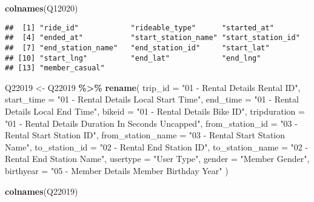 \documentclass[
]{article}
\newenvironment{Shaded}{\begin{snugshade}}{\end{snugshade}}
\newcommand{\AttributeTok}[1]{\textcolor[rgb]{0.13,0.29,0.53}{#1}}
\newcommand{\FunctionTok}[1]{\textcolor[rgb]{0.13,0.29,0.53}{\textbf{#1}}}
\newcommand{\NormalTok}[1]{#1}
\newcommand{\OtherTok}[1]{\textcolor[rgb]{0.56,0.35,0.01}{#1}}
\newcommand{\SpecialCharTok}[1]{\textcolor[rgb]{0.81,0.36,0.00}{\textbf{#1}}}
\newcommand{\StringTok}[1]{\textcolor[rgb]{0.31,0.60,0.02}{#1}}
\begin{document}
\begin{Shaded}
\begin{Highlighting}[]
\FunctionTok{colnames}\NormalTok{(Q12020)}
\end{Highlighting}
\end{Shaded}

\begin{verbatim}
##  [1] "ride_id"            "rideable_type"      "started_at"        
##  [4] "ended_at"           "start_station_name" "start_station_id"  
##  [7] "end_station_name"   "end_station_id"     "start_lat"         
## [10] "start_lng"          "end_lat"            "end_lng"           
## [13] "member_casual"
\end{verbatim}

\begin{Shaded}
\begin{Highlighting}[]
\NormalTok{Q22019 }\OtherTok{\textless{}{-}}\NormalTok{ Q22019 }\SpecialCharTok{\%\textgreater{}\%} 
  \FunctionTok{rename}\NormalTok{(}
    \AttributeTok{trip\_id =} \StringTok{"01 {-} Rental Details Rental ID"}\NormalTok{,}
    \AttributeTok{start\_time =} \StringTok{"01 {-} Rental Details Local Start Time"}\NormalTok{,}
    \AttributeTok{end\_time =} \StringTok{"01 {-} Rental Details Local End Time"}\NormalTok{,}
    \AttributeTok{bikeid =} \StringTok{"01 {-} Rental Details Bike ID"}\NormalTok{,}
    \AttributeTok{tripduration =} \StringTok{"01 {-} Rental Details Duration In Seconds Uncapped"}\NormalTok{,}
    \AttributeTok{from\_station\_id =} \StringTok{"03 {-} Rental Start Station ID"}\NormalTok{,}
    \AttributeTok{from\_station\_name =} \StringTok{"03 {-} Rental Start Station Name"}\NormalTok{,}
    \AttributeTok{to\_station\_id =} \StringTok{"02 {-} Rental End Station ID"}\NormalTok{,}
    \AttributeTok{to\_station\_name =} \StringTok{"02 {-} Rental End Station Name"}\NormalTok{,}
    \AttributeTok{usertype =} \StringTok{"User Type"}\NormalTok{,}
    \AttributeTok{gender =} \StringTok{"Member Gender"}\NormalTok{,}
    \AttributeTok{birthyear =} \StringTok{"05 {-} Member Details Member Birthday Year"}
\NormalTok{    )}
\end{Highlighting}
\end{Shaded}

\begin{Shaded}
\begin{Highlighting}[]
\FunctionTok{colnames}\NormalTok{(Q22019)}
\end{Highlighting}
\end{Shaded}
\end{document}

